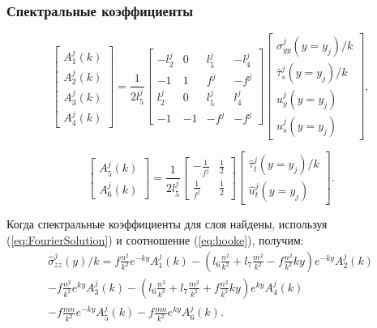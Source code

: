 \documentclass[10pt]{beamer}
\begin{document}
\begin{frame}
\frametitle{Спектральные коэффициенты}
\begin{equation}
	\label{eq:AS}
	\left[
	\begin{array}{c}
	A^{j}_{1}(k) \\
	A^{j}_{2}(k)\\
	A^{j}_{3}(k) \\
	A^{j}_{4}(k)
	\end{array}
	\right]
	= \frac{1}{2l^j_5}
	\left[
	\begin{array}{cccc}
		-l^j_2 & 0 & l^j_5 & -l^j_4 \\
		-1 & 1 & f^j & -f^j \\
		l^j_2 & 0 & l^j_5 & l^j_4 \\
		-1 & -1 & -f^j & -f^j
	\end{array}
	\right]
	\left[
	\begin{array}{c}
	\hat{\sigma}^{j}_{yy}(y=y_j)/k \\
	\hat{\tau}^{j}_{s}(y=y_j)/k\\
	\hat{u}^{j}_{y}(y=y_j) \\
	\hat{u}^{j}_{s}(y=y_j) 
	\end{array}
	\right],
\end{equation}

\begin{equation}
	\label{eq:At}
	\left[
	\begin{array}{c}
	A^{j}_{5}(k) \\
	A^{j}_{6}(k)
	\end{array}
	\right]
	= \frac{1}{2l^j_5}
	\left[
	\begin{array}{cc}
		-\frac{1}{f^j} & \frac{1}{2} \\
		\frac{1}{f^j} & \frac{1}{2}
	\end{array}
	\right]
	\left[
	\begin{array}{c}
	\hat{\tau}^{j}_{t}(y=y_j)/k\\
	\hat{u}^{j}_{t}(y=y_j) 
	\end{array}
	\right].
\end{equation}

Когда спектральные коэффициенты для слоя найдены, используя (\ref{eq:FourierSolution}) и соотношение (\ref{eq:hooke}), получим:
\begin{multline}
	\hat{\sigma}^j_{zz}(y)/k = f\frac{n^2}{k^2}e^{-ky}A^j_1(k)
	- \left(l_6\frac{n^2}{k^2}+l_7\frac{m^2}{k^2}-f\frac{n^2}{k^2}ky \right)e^{-ky}A^j_2(k) \\
	- f\frac{n^2}{k^2}e^{ky}A^j_3(k)
	- \left(l_6\frac{n^2}{k^2}+l_7\frac{m^2}{k^2}+f\frac{n^2}{k^2}ky \right)e^{ky}A^j_4(k) \\
	- f\frac{mn}{k^2}e^{-ky}A^j_5(k)
	- f\frac{mn}{k^2}e^{ky}A^j_6(k).
\end{multline}
\end{frame}
\end{document}
